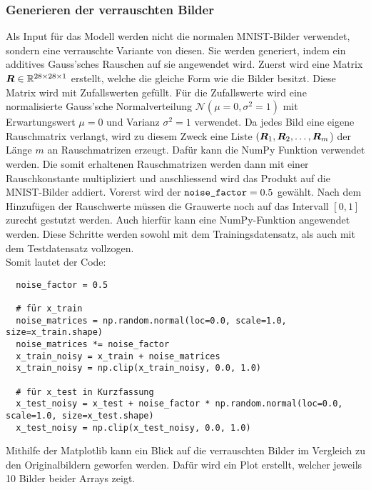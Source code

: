\subsubsection{Generieren der verrauschten Bilder}\label{sec:generierung_verrauschte_bilder}
Als Input für das Modell werden nicht die normalen MNIST-Bilder verwendet, sondern
eine verrauschte Variante von diesen. Sie werden generiert, indem ein
additives Gauss'sches Rauschen auf sie angewendet wird.
\para{}
Zuerst wird eine Matrix $\bm{R} \in \mathbb{R}^{28 \times 28 \times 1}$ erstellt, welche die gleiche Form wie die
Bilder besitzt. Diese Matrix wird mit Zufallswerten gefüllt. Für die
Zufallswerte wird eine normalisierte Gauss'sche Normalverteilung
$\mathcal{N}(\mu = 0, \sigma^2 = 1)$ mit Erwartungswert $\mu = 0$ und Varianz
$\sigma^2 = 1$ verwendet. Da jedes Bild eine eigene Rauschmatrix verlangt,
wird zu diesem Zweck eine Liste $(\bm{R}_1,\bm{R}_2,\ldots,\bm{R}_m$) der Länge $m$ an
Rauschmatrizen erzeugt. Dafür kann die NumPy Funktion
 verwendet werden.
Die somit erhaltenen Rauschmatrizen werden dann mit einer Rauschkonstante
 multipliziert und anschliessend wird das Produkt auf die
MNIST-Bilder addiert. Vorerst wird der $\texttt{noise\_factor} = 0.5$ gewählt.
Nach dem Hinzufügen der Rauschwerte müssen die Grauwerte noch auf das Intervall
$[0,1]$ zurecht gestutzt werden. Auch hierfür kann eine NumPy-Funktion
 angewendet werden. Diese Schritte werden sowohl mit dem
Trainingsdatensatz, als auch mit dem Testdatensatz vollzogen. \\
Somit lautet der Code:
\begin{verbatim}
  noise_factor = 0.5

  # für x_train
  noise_matrices = np.random.normal(loc=0.0, scale=1.0, size=x_train.shape)
  noise_matrices *= noise_factor
  x_train_noisy = x_train + noise_matrices
  x_train_noisy = np.clip(x_train_noisy, 0.0, 1.0)

  # für x_test in Kurzfassung
  x_test_noisy = x_test + noise_factor * np.random.normal(loc=0.0, scale=1.0, size=x_test.shape)
  x_test_noisy = np.clip(x_test_noisy, 0.0, 1.0)
\end{verbatim}
\para{}
Mithilfe der Matplotlib kann ein Blick auf die verrauschten Bilder im Vergleich zu
den Originalbildern geworfen werden.
Dafür wird ein Plot erstellt, welcher jeweils 10 Bilder beider Arrays zeigt.

